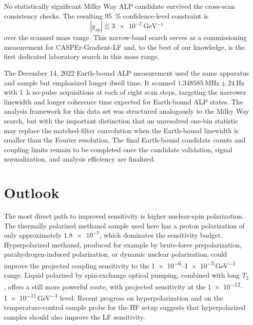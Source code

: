 No statistically significant Milky Way ALP candidate survived the cross-scan consistency checks.
The resulting \SI{95}{\percent} confidence-level constraint is
\begin{equation}
    |g_\mathrm{ap}| \lesssim \SI{3e-2}{\GeV^{-1}}
\end{equation}
over the scanned mass range.
This narrow-band search serves as a commissioning measurement for CASPEr-Gradient-LF and, to the best of our knowledge, is the first dedicated laboratory search in this mass range.

The December 14, 2022 Earth-bound ALP measurement used the same apparatus and sample but emphasized longer dwell time.
It scanned $\SI{1.348585}{\MHz}\pm\SI{24}{\Hz}$ with \SI{1}{\hour} no-pulse acquisitions at each of eight scan steps, targeting the narrower linewidth and longer coherence time expected for Earth-bound ALP states.
The analysis framework for this data set was structured analogously to the Milky Way search, but with the important distinction that an unresolved one-bin statistic may replace the matched-filter convolution when the Earth-bound linewidth is smaller than the Fourier resolution.
The final Earth-bound candidate counts and coupling limits remain to be completed once the candidate validation, signal normalization, and analysis efficiency are finalized.

\section{Outlook}

The most direct path to improved sensitivity is higher nuclear-spin polarization.
The thermally polarized methanol sample used here has a proton polarization of only approximately $\num{1.8e-7}$, which dominates the sensitivity budget.
Hyperpolarized methanol, produced for example by brute-force prepolarization, parahydrogen-induced polarization, or dynamic nuclear polarization, could improve the projected coupling sensitivity to the \num{1e-6}--\num{1e-5}\,\si{\GeV^{-1}} range.
Liquid  polarized by spin-exchange optical pumping, combined with long $T_2$, offers a still more powerful route, with projected sensitivity at the \num{1e-12}--\num{1e-11}\,\si{\GeV^{-1}} level.
Recent progress on  hyperpolarization and on the temperature-control sample probe for the HF setup suggests that hyperpolarized samples should also improve the LF sensitivity.

